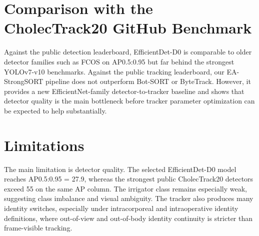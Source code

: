 \documentclass[12pt,a4paper]{report}
\begin{document}
\section{Comparison with the CholecTrack20 GitHub Benchmark}
Against the public detection leaderboard, EfficientDet-D0 is comparable to older detector families such as FCOS on AP0.5:0.95 but far behind the strongest YOLOv7-v10 benchmarks. Against the public tracking leaderboard, our EA-StrongSORT pipeline does not outperform Bot-SORT or ByteTrack. However, it provides a new EfficientNet-family detector-to-tracker baseline and shows that detector quality is the main bottleneck before tracker parameter optimization can be expected to help substantially.
\begin{table}[H]
\centering
\small
{}
\caption{Tracking comparison against selected CholecTrack20 GitHub benchmark entries.}
\label{tab:tracking_compare}
\end{table}
\section{Limitations}
The main limitation is detector quality. The selected EfficientDet-D0 model reaches AP0.5:0.95 = 27.9, whereas the strongest public CholecTrack20 detectors exceed 55 on the same AP column. The irrigator class remains especially weak, suggesting class imbalance and visual ambiguity. The tracker also produces many identity switches, especially under intracorporeal and intraoperative identity definitions, where out-of-view and out-of-body identity continuity is stricter than frame-visible tracking.
\end{document}
